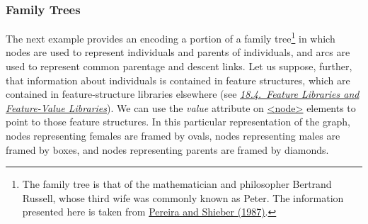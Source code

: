 \subsubsection[{Family Trees}]{Family Trees}\label{GDFT}\par
The next example provides an encoding a portion of a family tree\footnote{The family tree is that of the mathematician and philosopher Bertrand Russell, whose third wife was commonly known as Peter. The information presented here is taken from \hyperref[GDFT-eg-12]{Pereira and Shieber (1987)}.} in which nodes are used to represent individuals and parents of individuals, and arcs are used to represent common parentage and descent links. Let us suppose, further, that information about individuals is contained in feature structures, which are contained in feature-structure libraries elsewhere (see \textit{\hyperref[FSFL]{18.4.\ Feature Libraries and Feature-Value Libraries}}). We can use the {\itshape value} attribute on \hyperref[TEI.node]{<node>} elements to point to those feature structures. In this particular representation of the graph, nodes representing females are framed by ovals, nodes representing males are framed by boxes, and nodes representing parents are framed by diamonds.\par
